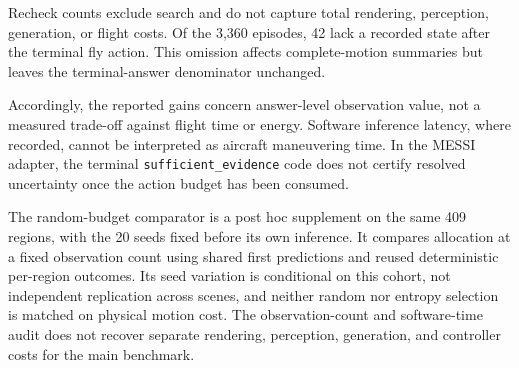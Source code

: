 Recheck counts exclude search and do not capture total rendering, perception, generation, or flight costs. Of the 3,360 episodes, 42 lack a recorded state after the terminal fly action. This omission affects complete-motion summaries but leaves the terminal-answer denominator unchanged.

Accordingly, the reported gains concern answer-level observation value, not a measured trade-off against flight time or energy. Software inference latency, where recorded, cannot be interpreted as aircraft maneuvering time. In the MESSI adapter, the terminal \texttt{sufficient\_evidence} code does not certify resolved uncertainty once the action budget has been consumed.


The random-budget comparator is a post hoc supplement on the same 409 regions, with the 20 seeds fixed before its own inference. It compares allocation at a fixed observation count using shared first predictions and reused deterministic per-region outcomes. Its seed variation is conditional on this cohort, not independent replication across scenes, and neither random nor entropy selection is matched on physical motion cost. The observation-count and software-time audit does not recover separate rendering, perception, generation, and controller costs for the main benchmark.
